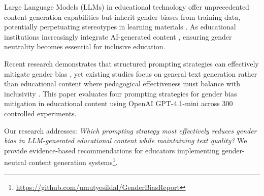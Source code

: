 Large Language Models (LLMs) in educational technology offer unprecedented content generation capabilities but inherit gender biases from training data, potentially perpetuating stereotypes in learning materials \cite{urchs2024chatgptbias, zhao2024multilangbias, lee2024lifecycle}. As educational institutions increasingly integrate AI-generated content \cite{beale2025revolution, pelaez2024impact}, ensuring gender neutrality becomes essential for inclusive education.

Recent research demonstrates that structured prompting strategies can effectively mitigate gender bias \cite{zeng2024debiasprompting, savoldi2024neutraltranslation}, yet existing studies focus on general text generation rather than educational content where pedagogical effectiveness must balance with inclusivity \cite{crawfurd2024sexist, nilsson2021chemistry}. This paper evaluates four prompting strategies for gender bias mitigation in educational content using OpenAI GPT-4.1-mini across 300 controlled experiments.

Our research addresses: \textit{Which prompting strategy most effectively reduces gender bias in LLM-generated educational content while maintaining text quality?} We provide evidence-based recommendations for educators implementing gender-neutral content generation systems\footnote{\url{https://github.com/umutyesildal/GenderBiasReport}}.